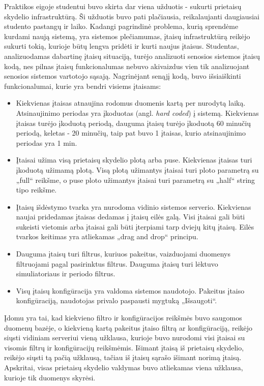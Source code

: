 \documentclass{VUMIFPSbakalaurinis}
\begin{document}
Praktikos eigoje studentui buvo skirta dar viena užduotis - sukurti prietaisų skydelio infrastruktūrą. Ši užduotis buvo pati plačiausia, reikalaujanti daugiausiai studento pastangų ir laiko. Kadangi pagrindinė problema, kurią sprendėme kurdami naują sistemą, yra sistemos plečiamumas, įtaisų infrastruktūrą reikėjo sukurti tokią, kurioje būtų lengva pridėti ir kurti naujus įtaisus. Studentas, analizuodamas dabartinę įtaisų situaciją, turėjo analizuoti senosios sistemos įtaisų kodą, nes pilnas įtaisų funkcionalumas nebuvo akivaizdus vien tik analizuojant senosios sistemos vartotojo sąsają. Nagrinėjant senąjį kodą, buvo išsiaiškinti funkcionalumai, kurie yra bendri visiems įtaisams:
\begin{itemize}
    \item Kiekvienas įtaisas atnaujina rodomus duomenis kartą per nurodytą laiką. Atsinaujinimo periodas yra įkoduotas (angl. \textit{hard coded}) į sistemą. Kiekvienas įtaisas turėjo įkoduotą periodą, dauguma įtaisų turėjo įkoduotą 60 minučių periodą, keletas - 20 minučių, taip pat buvo 1 įtaisas, kurio atsinaujinimo periodas yra 1 min.
    \item Įtaisai užima visą prietaisų skydelio plotą arba puse. Kiekvienas įtaisas turi įkoduotą užimamą plotą. Visą plotą užimantys įtaisai turi ploto parametrą su „full“ reikšme, o puse ploto užimantys įtaisai turi parametrą su „half“ string tipo reikšme.
    \item Įtaisų išdėstymo tvarka yra nurodoma vidinio sistemos serverio. Kiekvienas naujai pridedamas įtaisas dedamas į įtaisų eilės galą. Visi įtaisai gali būti sukeisti vietomis arba įtaisai gali būti įterpiami tarp dviejų kitų įtaisų. Eilės tvarkos keitimas yra atliekamas „drag and drop“ principu.
    \item Dauguma įtaisų turi filtrus, kuriuos pakeitus, vaizduojami duomenys filtruojami pagal pasirinktus filtrus. Dauguma įtaisų turi lėktuvo simuliatoriaus ir periodo filtrus.
    \item Visų įtaisų konfigūracija yra valdoma sistemos naudotojo. Pakeitus įtaiso konfigūraciją, naudotojas privalo paspausti mygtuką „Išsaugoti“. 
\end{itemize}

Įdomu yra tai, kad kiekvieno filtro ir konfigūracijos reikšmės buvo saugomos duomenų bazėje, o kiekvieną kartą pakeitus įtaiso filtrą ar konfigūraciją, reikėjo siųsti vidiniam serveriui vieną užklausa, kurioje buvo nurodomi visi įtaisai su visomis filtrų ir konfigūracijų reikšmėmis. Išimant įtaisą iš prietaisų skydelio, reikėjo siųsti tą pačią užklausą, tačiau iš įtaisų sąrašo išimant norimą įtaisą. Apskritai, visas prietaisų skydelio valdymas buvo atliekamas viena užklausa, kurioje tik duomenys skyrėsi.
\end{document}
